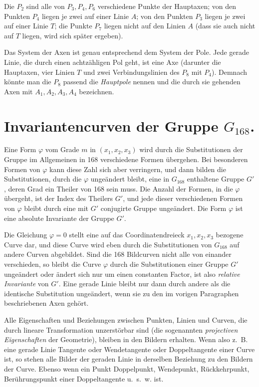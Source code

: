 \documentclass[12pt,a4paper]{article}
\begin{document}
Die $P_2$ sind alle von $P_3, P_4, P_6$ verschiedene Punkte der Hauptaxen; von den Punkten $P_4$ liegen je zwei auf einer Linie $A$; von den Punkten $P_3$ liegen je zwei auf einer Linie $T$; die Punkte $P_7$ liegen nicht auf den Linien $A$ (dass sie auch nicht auf $T$ liegen, wird sich sp\"ater ergeben).

Das System der Axen ist genau entsprechend dem System der Pole. Jede gerade Linie, die durch einen achtz\"ahligen Pol geht, ist eine Axe (darunter die Hauptaxen, vier Linien $T$ und zwei Verbindungslinien des $P_8$ mit $P_4$). Demnach k\"onnte man die $P_8$ passend die \textit{Hauptpole} nennen und die durch sie gehenden Axen mit $A_1, A_2, A_3, A_4$ bezeichnen.

\newpage
\section{Invariantencurven der Gruppe $G_{168}$.}
\label{sec:121}

Eine Form $\varphi$ vom Grade $m$ in $(x_1, x_2, x_3)$ wird durch die Substitutionen der Gruppe im Allgemeinen in 168 verschiedene Formen \"ubergehen. Bei besonderen Formen von $\varphi$ kann diese Zahl sich aber verringern, und dann bilden die Substitutionen, durch die $\varphi$ unge\"andert bleibt, eine in $G_{168}$ enthaltene Gruppe $G'$, deren Grad ein Theiler von 168 sein muss. Die Anzahl der Formen, in die $\varphi$ \"ubergeht, ist der Index des Theilers $G'$, und jede dieser verschiedenen Formen von $\varphi$ bleibt durch eine mit $G'$ conjugirte Gruppe unge\"andert. Die Form $\varphi$ ist eine absolute Invariante der Gruppe $G'$.

Die Gleichung $\varphi = 0$ stellt eine auf das Coordinatendreieck $x_1, x_2, x_3$ bezogene Curve dar, und diese Curve wird eben durch die Substitutionen von $G_{168}$ auf andere Curven abgebildet. Sind die 168 Bildcurven nicht alle von einander verschieden, so bleibt die Curve $\varphi$ durch die Substitutionen einer Gruppe $G'$ unge\"andert oder \"andert sich nur um einen constanten Factor, ist also \textit{relative Invariante} von $G'$. Eine gerade Linie bleibt nur dann durch andere als die identische Substitution unge\"andert, wenn sie zu den im vorigen Paragraphen beschriebenen Axen geh\"ort.

Alle Eigenschaften und Beziehungen zwischen Punkten, Linien und Curven, die durch lineare Transformation unzerst\"orbar sind (die sogenannten \textit{projectiven Eigenschaften} der Geometrie), bleiben in den Bildern erhalten. Wenn also z.~B. eine gerade Linie Tangente oder Wendetangente oder Doppeltangente einer Curve ist, so stehen alle Bilder der geraden Linie in derselben Beziehung zu den Bildern der Curve. Ebenso wenn ein Punkt Doppelpunkt, Wendepunkt, R\"uckkehrpunkt, Ber\"uhrungspunkt einer Doppeltangente u.~s.~w. ist.
\end{document}
